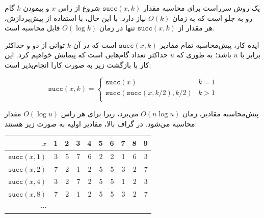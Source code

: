 \begin{center}
\end{center}

یک روش سرراست برای محاسبه مقدار $\texttt{succ}(x,k)$ شروع از راس $x$ و پیمودن $k$ گام رو به جلو است که به زمان $O(k)$ نیاز دارد.
با این حال، با استفاده از پیش‌پردازش، هر مقدار از $\texttt{succ}(x,k)$ تنها در زمان $O(\log k)$ قابل محاسبه است.

ایده کار، پیش‌محاسبه تمام مقادیر $\texttt{succ}(x,k)$ است که در آن $k$ توانی از دو و حداکثر برابر با $u$ باشد؛ به طوری که $u$ حداکثر تعداد گام‌هایی است که پیمایش خواهیم کرد.
این کار با بازگشت زیر به صورت کارا انجام‌پذیر است:

\begin{equation*}
    \texttt{succ}(x,k) = \begin{cases}
               \texttt{succ}(x)              & k = 1\\
               \texttt{succ}(\texttt{succ}(x,k/2),k/2)   & k > 1\\
           \end{cases}
\end{equation*}

پیش‌محاسبه مقادیر، زمان $O(n \log u)$ می‌برد، زیرا برای هر راس $O(\log u)$ مقدار محاسبه می‌شود.
در گراف بالا، مقادیر اولیه به صورت زیر هستند:

\begin{center}
\begin{tabular}{r|rrrrrrrrr}
$x$ & 1 & 2 & 3 & 4 & 5 & 6 & 7 & 8 & 9 \\
\hline
$\texttt{succ}(x,1)$ & 3 & 5 & 7 & 6 & 2 & 2 & 1 & 6 & 3 \\
$\texttt{succ}(x,2)$ & 7 & 2 & 1 & 2 & 5 & 5 & 3 & 2 & 7 \\
$\texttt{succ}(x,4)$ & 3 & 2 & 7 & 2 & 5 & 5 & 1 & 2 & 3 \\
$\texttt{succ}(x,8)$ & 7 & 2 & 1 & 2 & 5 & 5 & 3 & 2 & 7 \\
$\cdots$ \\
\end{tabular}
\end{center}

